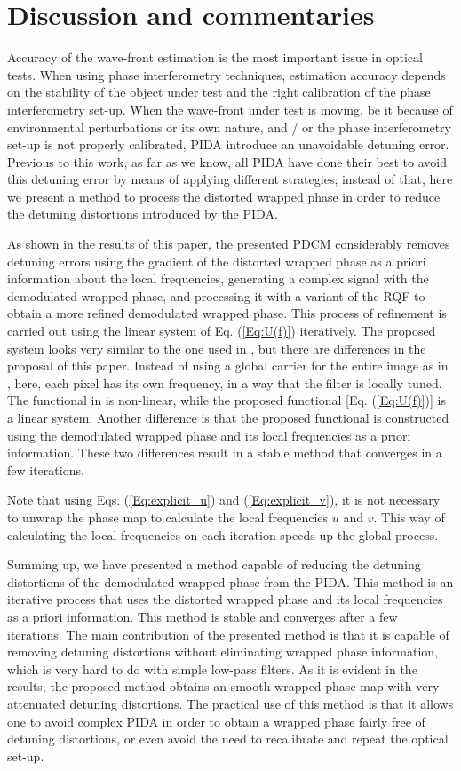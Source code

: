 \section{Discussion and commentaries}
Accuracy of the wave-front estimation is the most important issue in optical 
tests. When using phase interferometry techniques, estimation accuracy depends 
on the stability of the object under test and the right calibration of the 
phase 
interferometry set-up. When the wave-front under test is moving, be it because 
of environmental perturbations or its own nature, and / or the phase 
interferometry set-up is not properly calibrated, PIDA introduce an unavoidable 
detuning error. Previous to this work, as far as we know, all PIDA have done 
their best to avoid this detuning error by means of applying different 
strategies; instead of that, here we present a method to process the distorted 
wrapped phase in order to reduce the detuning distortions introduced by the 
PIDA.

As shown in the results of this paper, the presented PDCM considerably 
removes detuning errors using the gradient of the distorted wrapped phase as a 
priori information about the local frequencies, generating a complex signal 
with the demodulated wrapped phase, and processing it with a variant of the RQF 
to obtain a more refined demodulated wrapped phase. This process of refinement 
is carried out using the linear system of Eq. (\ref{Eq:U(f)}) iteratively. The 
proposed system looks very similar to the one used in \cite{RQF}, but there 
are differences in the proposal of this paper. Instead of using a global 
carrier for the entire image as in \cite{RQF}, here, each pixel has its own 
frequency, in a way that the filter is locally tuned. The functional in 
\cite{RQF} is non-linear, while the proposed functional [Eq. (\ref{Eq:U(f)})] 
is a linear system. Another difference is that the proposed functional is 
constructed using the demodulated wrapped phase and its local frequencies as a 
priori information. These two differences result in a stable method that 
converges in a few iterations. 

Note that using Eqs. (\ref{Eq:explicit_u}) and (\ref{Eq:explicit_v}), it is 
not necessary to unwrap the phase map to calculate the local frequencies 
$u$ and $v$. This way of calculating the local frequencies on each 
iteration speeds up the global process.

Summing up, we have presented a method capable of reducing the 
detuning distortions of the demodulated wrapped phase from the PIDA. This 
method is an iterative process that uses the distorted wrapped phase and 
its local frequencies as a priori information. This method is stable and 
converges after a few iterations. The main contribution of the presented 
method is that it is capable of removing detuning distortions without 
eliminating wrapped phase information, which is very hard to do with 
simple low-pass filters. As it is evident in the results, the proposed 
method obtains an smooth wrapped phase map with very attenuated detuning 
distortions. The practical use of this method is that it allows one to avoid 
complex PIDA in order to obtain a wrapped phase fairly free of detuning 
distortions, or even avoid the need to recalibrate and repeat the optical 
set-up.

